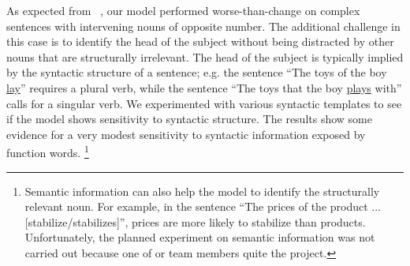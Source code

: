 As expected from ~\citep{Linzen2016}, our model performed 
worse-than-change on complex sentences with
intervening nouns of opposite number.
The additional challenge in this case is
to identify the head of the subject 
without being distracted by other nouns
that are structurally irrelevant. 
The head of the subject is typically implied 
by the syntactic structure of a sentence;
e.g. the sentence ``The toys of the boy \underline{lay}''
requires a plural verb, while the sentence
``The toys that the boy \underline{plays} with''
calls for a singular verb.
We experimented with various syntactic templates
to see if the model shows sensitivity to
syntactic structure.
The results show some evidence for a very 
modest sensitivity to syntactic information 
exposed by function words. 
\footnote{ 
Semantic information can also help the model
to identify the structurally relevant noun.
For example, in the sentence ``The prices of the product ... [stabilize/stabilizes]'', prices are more likely to stabilize than products.
Unfortunately, the planned experiment on semantic information was not carried out because one of or team members quite the project.} 







